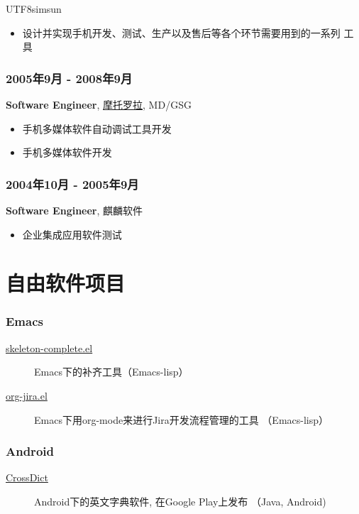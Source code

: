 \documentclass[11pt,dvipdfm,CJKbookmarks]{article}
\begin{document}
\begin{CJK*}{UTF8}{simsun}
\begin{itemize}
\item 设计并实现手机开发、测试、生产以及售后等各个环节需要用到的一系列
工具
\end{itemize}

\subsubsection{2005年9月 - 2008年9月}
\label{sec-1-0-4}

\textbf{Software Engineer}, \href{http://motorola.com}{摩托罗拉},  MD/GSG

\begin{itemize}
\item 手机多媒体软件自动调试工具开发

\item 手机多媒体软件开发
\end{itemize}
\subsubsection{2004年10月 - 2005年9月}
\label{sec-1-0-5}
\textbf{Software Engineer}, 麒麟软件

\begin{itemize}
\item 企业集成应用软件测试
\end{itemize}
\section{自由软件项目}
\label{sec-2}

\subsubsection{Emacs}
\label{sec-2-0-1}

\begin{description}
\item[\href{http://github.com/baohaojun/skeleton-complete}{skeleton-complete.el}] Emacs下的补齐工具（Emacs-lisp）

\item[\href{https://github.com/baohaojun/org-jira}{org-jira.el}] Emacs下用org-mode来进行Jira开发流程管理的工具
（Emacs-lisp）
\end{description}
\subsubsection{Android}
\label{sec-2-0-2}
\begin{description}
\item[\href{https://github.com/baohaojun/BTAndroidWebViewSelection}{CrossDict}] Android下的英文字典软件, 在Google Play上发布
（Java, Android)
\end{description}

\end{CJK*}
\end{document}
